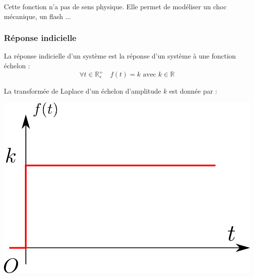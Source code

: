 \documentclass[10pt,fleqn]{article} %
\begin{document}
Cette fonction n'a pas de sens physique. Elle permet de modéliser un choc mécanique, un flash ...



\subsubsection*{Réponse indicielle}
\begin{minipage}[c]{.6\linewidth}
\begin{defi}
La réponse indicielle d'un système est la réponse d'un système à une fonction échelon :
$$ \forall t \in \mathbb{R}^+_* \quad f(t)=k \text{ avec } k\in\mathbb{R}$$

La transformée de Laplace d'un échelon d'amplitude $k$ est donnée par :

\end{defi}
\end{minipage} \hfill
\begin{minipage}[c]{.35\linewidth}
\begin{center}
\includegraphics[width=.9\textwidth]{images/echelon}
\end{center}
\end{minipage}
\end{document}
